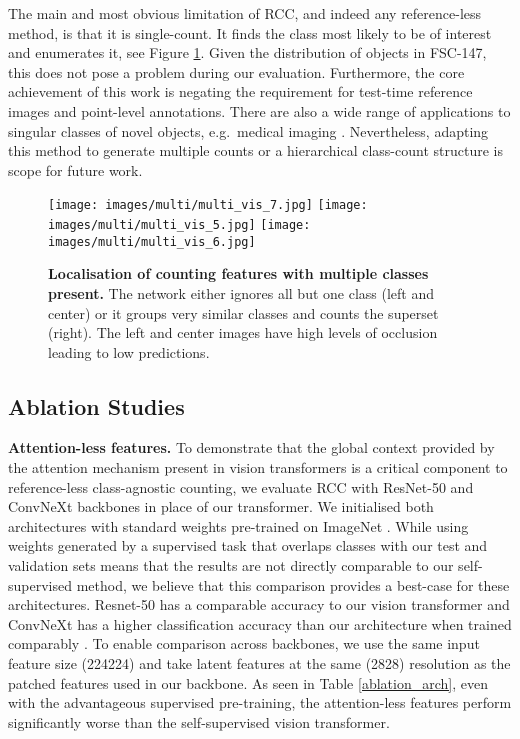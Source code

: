 \documentclass[letterpaper, 11pt]{IEEEtran}
\begin{document}
The main and most obvious limitation of RCC, and indeed any reference-less method, is that it is single-count. It finds the class most likely to be of interest and enumerates it, see Figure \ref{figure_multiclass}. Given the distribution of objects in FSC-147, this does not pose a problem during our evaluation.
Furthermore, the core achievement of this work is negating the requirement for test-time reference images and point-level annotations. There are also a wide range of applications to singular classes of novel objects, e.g.\ medical imaging \cite{xie2018microscopy}.
Nevertheless, adapting this method to generate multiple counts or a hierarchical class-count structure is scope for future work.
\begin{figure}
    \centering
       \texttt{[image: images/multi/multi\_vis\_7.jpg]}
\texttt{[image: images/multi/multi\_vis\_5.jpg]}
\texttt{[image: images/multi/multi\_vis\_6.jpg]}
     \caption{\textbf{Localisation of counting features with multiple classes present.} 
    The network either ignores all but one class (left and center) or it groups very similar classes and counts the superset (right). The left and center images have high levels of occlusion leading to low predictions.
    }
    \label{figure_multiclass}
\end{figure}

\vspace{5mm}
\subsection{Ablation Studies}
\label{results_ablationstudies}

\textbf{Attention-less features.}
To demonstrate that the global context provided by the attention mechanism present in vision transformers is a critical component to reference-less class-agnostic counting, we evaluate RCC with ResNet-50 \cite{he2016resnet} and ConvNeXt \cite{liu2022convnext} backbones in place of our transformer. 
We initialised both architectures with standard weights pre-trained on ImageNet \cite{deng2009imagenet}. 
While using weights generated by a supervised task that overlaps classes with our test and validation sets means that the results are not directly comparable to our self-supervised method, we believe that this comparison provides a best-case for these architectures.
Resnet-50 has a comparable accuracy to our vision transformer and ConvNeXt has a higher classification accuracy than our architecture when trained comparably \cite{liu2022convnext}.
To enable comparison across backbones, we use the same input feature size (224224) and take latent features at the same (2828) resolution as the patched features used in our backbone. 
As seen in Table \ref{ablation_arch}, even with the advantageous supervised pre-training, the attention-less features perform significantly worse than the self-supervised vision transformer.
\end{document}
